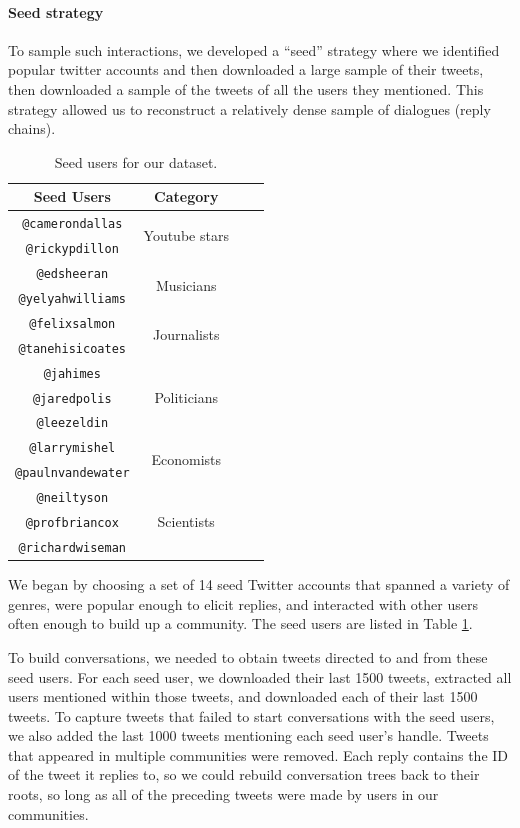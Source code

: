 \documentclass[11pt,letterpaper]{article}
\begin{document}
\paragraph{Seed strategy}

To sample such interactions, we developed a ``seed'' strategy where we identified popular twitter accounts and then downloaded a large sample of their tweets, then downloaded a sample of the tweets of all the users they mentioned. This strategy allowed us to reconstruct a relatively dense sample of dialogues (reply chains).

\begin{table}
\begin{center}
\begin{tabular}{|c|c|c|c|}
\hline
Seed Users & Category \\ %
\hline
{\tt @camerondallas} & \multirow{2}{*}{Youtube stars} \\
{\tt @rickypdillon} & \\
\hline
{\tt @edsheeran} & \multirow{2}{*}{Musicians} \\
{\tt @yelyahwilliams} & \\
\hline
{\tt @felixsalmon} & \multirow{2}{*}{Journalists} \\
{\tt @tanehisicoates} & \\
\hline
{\tt @jahimes} & \multirow{3}{*}{Politicians} \\
{\tt @jaredpolis} & \\
{\tt @leezeldin} & \\
\hline
{\tt @larrymishel} & \multirow{2}{*}{Economists} \\
{\tt @paulnvandewater} & \\
\hline
{\tt @neiltyson} & \multirow{3}{*}{Scientists} \\
{\tt @profbriancox} & \\
{\tt @richardwiseman} & \\
\hline
\end{tabular}
\end{center}
\caption{\label{tab:seed-users} Seed users for our dataset.}
\end{table}

We began by choosing a set of 14 seed Twitter accounts that spanned a variety of genres, were popular enough to elicit replies, and interacted with other users often enough to build up a community.  The seed users are listed in Table \ref{tab:seed-users}.  

To build conversations, we needed to obtain tweets directed to and from these seed users. For each seed user, we downloaded their last 1500 tweets, extracted all users mentioned within those tweets, and downloaded each of their last 1500 tweets.  To capture tweets that failed to start conversations with the seed users, we also added the last 1000 tweets mentioning each seed user's handle.  Tweets that appeared in multiple communities were removed.  Each reply contains the ID of the tweet it replies to, so we could rebuild conversation trees back to their roots, so long as all of the preceding tweets were made by users in our communities.
\end{document}
